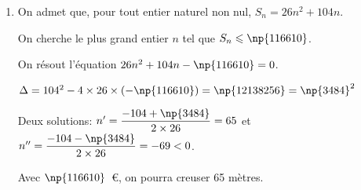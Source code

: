 \begin{enumerate}
\item On admet que, pour tout entier naturel non nul, $S_n=26n^2 +104n$. %

On cherche le plus grand entier $n$ tel que $S_n \leqslant \np{116610}$.

On résout l'équation $26n^2 + 104n - \np{116610}=0$.

$\Delta = 104^2 - 4 \times 26 \times (-\np{116610}) = \np{12138256} = \np{3484}^2$ 

Deux solutions: $n'=\dfrac{-104+\np{3484}}{2\times 26}=65$ et $n''=\dfrac{-104-\np{3484}}{2\times 26}=-69<0$.

Avec $\np{116610}$~\euro{}, on pourra creuser 65 mètres.

\end{enumerate}

\vspace{0.5cm}

